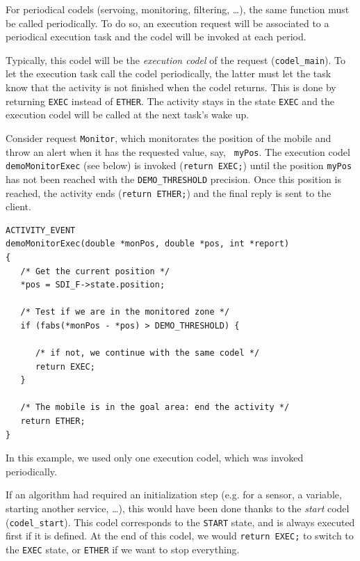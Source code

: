 For periodical codels (servoing, monitoring, filtering, \ldots), the same
function must be called periodically. To do so, an execution request will
be associated  to  a periodical  execution task  and  the  codel will  be
invoked at each period.

Typically, this codel  will be the {\em  execution codel} of the  request
({\tt  codel\_main}).  To let   the    execution task call   the  codel
periodically, the latter must let the task know that  the activity is not
finished  when the codel  returns.  This is done  by returning {\tt EXEC}
instead  of {\tt ETHER}.  The activity stays  in the state {\tt EXEC} and
the execution codel will be called at the next task's wake up.

Consider request {\tt Monitor},   which monitorates the position   of the
mobile and  throw an  alert when it   has the requested value, say,  {\tt
myPos}.  The  execution codel  {\tt  demoMonitorExec} (see below)  is invoked
({\tt return EXEC;}) until the position {\tt myPos}  has not been reached
with the {\tt DEMO\_THRESHOLD} precision. Once  this position is reached,
the activity ends ({\tt return  ETHER;}) and the  final reply is sent  to
the client.

\begin{center}\begin{cartouche}\small\begin{verbatim}
ACTIVITY_EVENT
demoMonitorExec(double *monPos, double *pos, int *report)
{
   /* Get the current position */
   *pos = SDI_F->state.position;

   /* Test if we are in the monitored zone */
   if (fabs(*monPos - *pos) > DEMO_THRESHOLD) {

      /* if not, we continue with the same codel */
      return EXEC;
   }

   /* The mobile is in the goal area: end the activity */
   return ETHER;
}
\end{verbatim}\end{cartouche}\end{center}

In this example,   we used only  one execution  codel, which  was invoked
periodically.

If an algorithm had required an  initialization step (e.g.  for a sensor,
a variable, starting another service, \ldots), this  would have been done
thanks to the {\em start} codel ({\tt codel\_start}).  This codel
corresponds to the {\tt START} state, and  is always executed first if it
is  defined. At the  end  of this codel,  we  would {\tt return EXEC;} to
switch to  the {\tt  EXEC} state, or   {\tt ETHER} if   we  want to  stop
everything.

